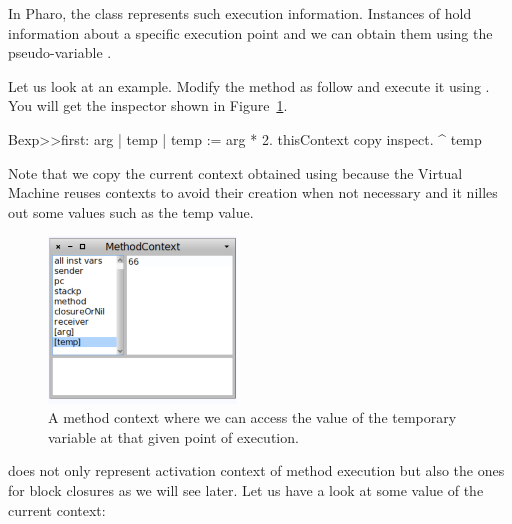\documentclass[a4paper,10pt,twoside]{book}
\begin{document}
In Pharo, the class  represents such execution information. Instances of  hold information about a specific execution point and we can obtain them using the pseudo-variable .

Let us look at an example. Modify the method as follow and execute it using . 
You will get the inspector shown in Figure~\ref{oneContext}.

\begin{code}
Bexp>>first: arg
	| temp | 	
	temp := arg * 2.
	thisContext copy inspect.
	^ temp
\end{code}

Note that we copy the current context obtained using  because the Virtual Machine reuses contexts to avoid their creation when not necessary and it nilles out some values such as the temp value.

\begin{figure}[!h]
\begin{center}\includegraphics[width=5cm]{oneContext}
\caption{A method context where we can access the value of the temporary variable  at that given point of execution.\label{oneContext}}
\end{center}
\end{figure}

 does not only represent activation context of method execution but also 
the ones for block closures as we will see later. Let us have a look at some value of the current context:
\end{document}
